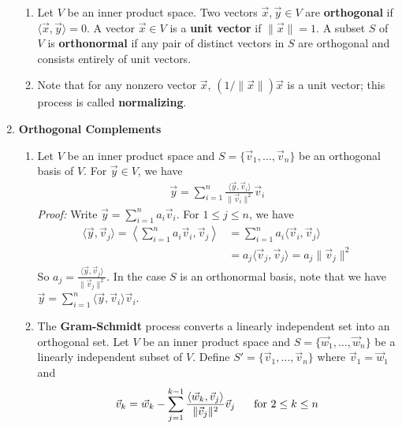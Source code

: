 \documentclass[10pt]{article}
\begin{document}
\begin{multicols*}{2}
\begin{enumerate}
\begin{enumerate}
        \item Let $V$ be an inner product space. Two vectors $\vec{x}, \vec{y} \in V$ are \textbf{orthogonal} if $\langle \vec{x}, \vec{y} \rangle = 0$. A vector $\vec{x} \in V$ is a \textbf{unit vector} if $\| \vec{x} \|=1$. A subset $S$ of $V$ is \textbf{orthonormal} if any pair of distinct vectors in $S$ are orthogonal and consists entirely of unit vectors. 
        \item Note that for any nonzero vector $\vec{x}$, $(1 / \| \vec{x} \|)\vec{x}$ is a unit vector; this process is called \textbf{normalizing}. 
    \end{enumerate}
    
    \item \textbf{Orthogonal Complements}
    \begin{enumerate}
        \item Let $V$ be an inner product space and $S=\{\vec{v}_1, \hdots, \vec{v}_n \}$ be an orthogonal basis of $V$. For $\vec{y}\in V$, we have
        \begin{align*}
            \vec{y} = \sum_{i=1}^n \frac{\langle \vec{y}, \vec{v}_i \rangle}{\|\vec{v}_i \|^2} \vec{v}_i
        \end{align*}
        \textit{Proof:} Write $\vec{y} = \sum_{i=1}^n a_i \vec{v}_i$. For $1 \leq j \leq n$, we have
        \begin{align*}
            \langle \vec{y}, \vec{v}_j \rangle 
            = \left< \sum_{i=1}^n a_i \vec{v}_i, \vec{v}_j \right> 
            &= \sum_{i=1}^n a_i \langle \vec{v}_i, \vec{v}_j \rangle \\
            &= a_j \langle \vec{v}_j, \vec{v}_j \rangle 
            = a_j \| \vec{v}_j \|^2
        \end{align*}
        So $a_j = \frac{\langle \vec{y}, \vec{v}_j \rangle}{\|\vec{v}_j \|^2}$. In the case $S$ is an orthonormal basis, note that we have $\vec{y} = \sum_{i=1}^n \langle \vec{y}, \vec{v}_i \rangle \vec{v}_i$.
        \item The \textbf{Gram-Schmidt} process converts a linearly independent set into an orthogonal set. Let $V$ be an inner product space and $S = \{ \vec{w}_1, \hdots, \vec{w}_n \}$ be a linearly independent subset of $V$. Define $S' = \{ \vec{v}_1, \hdots, \vec{v}_n \}$ where $\vec{v}_1 = \vec{w}_1$ and
        \begin{align*}
            \vec{v}_k = \vec{w}_k - \sum_{j=1}^{k-1} \frac{\langle \vec{w}_k, \vec{v}_j \rangle}{\| \vec{v}_j \|^2} \vec{v}_j \hspace{6mm} \text{for $2 \leq k \leq n$}

\end{align*}
\end{enumerate}
\end{enumerate}
\end{multicols*}
\end{document}
